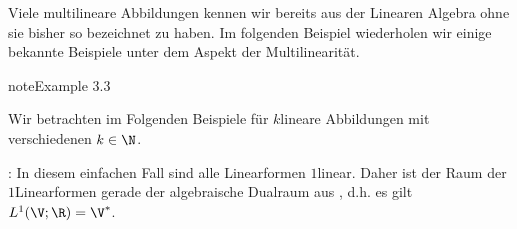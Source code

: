 \documentclass[letterpaper,10pt,german]{jupyterBook}
\begin{document}
\sphinxAtStartPar
Viele multilineare Abbildungen kennen wir bereits aus der Linearen Algebra ohne sie bisher so bezeichnet zu haben.
Im folgenden Beispiel wiederholen wir einige bekannte Beispiele unter dem Aspekt der Multilinearität.
\label{vektoranalysis/multilinear:ex:multilinear}
\begin{sphinxadmonition}{note}{Example 3.3}



\sphinxAtStartPar
Wir betrachten im Folgenden Beispiele für \(k\)\sphinxhyphen{}lineare Abbildungen mit verschiedenen \(k\in\N\).

\sphinxAtStartPar
{}: In diesem einfachen Fall sind alle Linearformen \(1\)\sphinxhyphen{}linear.
Daher ist der Raum der \(1\)\sphinxhyphen{}Linearformen gerade der algebraische Dualraum aus {\hyperref[\detokenize{vektoranalysis/multilinear:def:algebraischerDualraum}]{}}, d.h. es gilt \(L^1(\V; \R) = \V^\ast\).


\end{sphinxadmonition}
\end{document}
